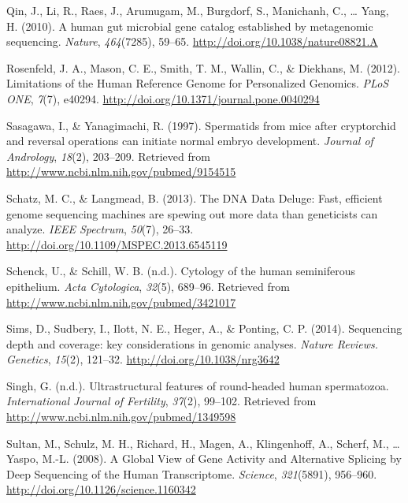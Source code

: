 \documentclass[12pt,twoside]{reedthesis}
\theoremstyle{definition}
\theoremstyle{definition}
\theoremstyle{remark}
\begin{document}
  \hypertarget{ref-Qin2010}{}
  Qin, J., Li, R., Raes, J., Arumugam, M., Burgdorf, S., Manichanh, C.,
  \ldots{} Yang, H. (2010). A human gut microbial gene catalog established
  by metagenomic sequencing. \emph{Nature}, \emph{464}(7285), 59--65.
  \url{http://doi.org/10.1038/nature08821.A}
  
  \hypertarget{ref-Rosenfeld2012}{}
  Rosenfeld, J. A., Mason, C. E., Smith, T. M., Wallin, C., \& Diekhans,
  M. (2012). Limitations of the Human Reference Genome for Personalized
  Genomics. \emph{PLoS ONE}, \emph{7}(7), e40294.
  \url{http://doi.org/10.1371/journal.pone.0040294}
  
  \hypertarget{ref-Sasagawa}{}
  Sasagawa, I., \& Yanagimachi, R. (1997). Spermatids from mice after
  cryptorchid and reversal operations can initiate normal embryo
  development. \emph{Journal of Andrology}, \emph{18}(2), 203--209.
  Retrieved from \url{http://www.ncbi.nlm.nih.gov/pubmed/9154515}
  
  \hypertarget{ref-Schatz2013}{}
  Schatz, M. C., \& Langmead, B. (2013). The DNA Data Deluge: Fast,
  efficient genome sequencing machines are spewing out more data than
  geneticists can analyze. \emph{IEEE Spectrum}, \emph{50}(7), 26--33.
  \url{http://doi.org/10.1109/MSPEC.2013.6545119}
  
  \hypertarget{ref-Schenck}{}
  Schenck, U., \& Schill, W. B. (n.d.). Cytology of the human seminiferous
  epithelium. \emph{Acta Cytologica}, \emph{32}(5), 689--96. Retrieved
  from \url{http://www.ncbi.nlm.nih.gov/pubmed/3421017}
  
  \hypertarget{ref-Sims2014}{}
  Sims, D., Sudbery, I., Ilott, N. E., Heger, A., \& Ponting, C. P.
  (2014). Sequencing depth and coverage: key considerations in genomic
  analyses. \emph{Nature Reviews. Genetics}, \emph{15}(2), 121--32.
  \url{http://doi.org/10.1038/nrg3642}
  
  \hypertarget{ref-Singh}{}
  Singh, G. (n.d.). Ultrastructural features of round-headed human
  spermatozoa. \emph{International Journal of Fertility}, \emph{37}(2),
  99--102. Retrieved from \url{http://www.ncbi.nlm.nih.gov/pubmed/1349598}
  
  \hypertarget{ref-Sultan2008}{}
  Sultan, M., Schulz, M. H., Richard, H., Magen, A., Klingenhoff, A.,
  Scherf, M., \ldots{} Yaspo, M.-L. (2008). A Global View of Gene Activity
  and Alternative Splicing by Deep Sequencing of the Human Transcriptome.
  \emph{Science}, \emph{321}(5891), 956--960.
  \url{http://doi.org/10.1126/science.1160342}
  
\end{document}
